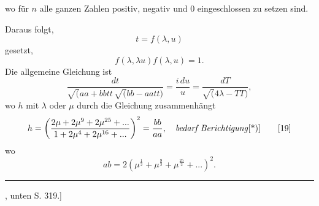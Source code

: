 \noindent wo für $n$ alle ganzen Zahlen positiv, negativ und $0$ eingeschlossen zu setzen sind.
\par\indent Daraus folgt,
\[t=f(\lambda,u)\]
\noindent gesetzt,
\[f(\lambda,\lambda u)f(\lambda,u)=1.\]
\noindent Die allgemeine Gleichung ist
\begin{equation}
\frac{dt}{\surd(aa+bbtt\,\surd(bb-aatt)}=\frac{i\,du}{u}=\frac{dT}{\surd(4\lambda-TT)},\tag*{[18]}
\end{equation}
\noindent wo $h$ mit $\lambda$ oder $\mu$ durch die Gleichung zusammenhängt
\clearpage{}
{\small\begin{equation}
h=\left(\frac{2\mu+2\mu^9+2\mu^{25}+{.}{.}{.}}{1+2\mu^4+2\mu^{16}+{.}{.}{.}}\right)^2=\frac{bb}{aa},\quad\text{\textit{bedarf Berichtigung}[*)]}\tag*{[19]}
\end{equation}}
\noindent [und] wo
\begin{equation}
ab=2(\mu^{\frac12}+\mu^{\frac92}+\mu^{\frac{25}2}+{.}{.}{.})^2.\tag*{[20]}
\end{equation}
\par\bigskip\noindent\rule{.25\linewidth}{.4pt}\par\smallskip
{\small\par\indent [*) Siehe art. [8.], unten S. 319.]\par}
\clearpage
\endgroup
